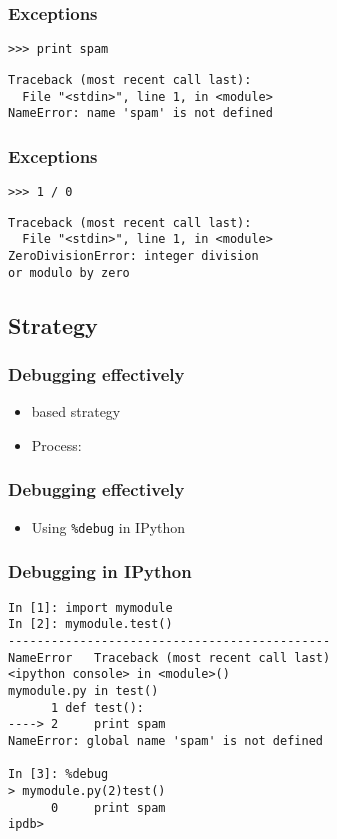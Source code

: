\documentclass[14pt,compress]{beamer}
\newcounter{time}
\newcommand{\inctime}[1]{\addtocounter{time}{#1}{\tiny \thetime\ m}}
\newcommand{\typ}[1]{\texttt{#1}}
\newcommand{\kwrd}[1]{ \texttt{\textbf{\color{blue}{#1}}}  }
\begin{document}
\begin{frame}[fragile]
 \frametitle{Exceptions}
 \begin{lstlisting}
>>> print spam
\end{lstlisting}
\pause
\begin{lstlisting}
Traceback (most recent call last):
  File "<stdin>", line 1, in <module>
NameError: name 'spam' is not defined
\end{lstlisting}
\end{frame}

\begin{frame}[fragile]
 \frametitle{Exceptions}
 \begin{lstlisting}
>>> 1 / 0
\end{lstlisting}
\pause
\begin{lstlisting}
Traceback (most recent call last):
  File "<stdin>", line 1, in <module>
ZeroDivisionError: integer division 
or modulo by zero
\end{lstlisting}
\end{frame}

\subsection{Strategy}
\begin{frame}[fragile]
    \frametitle{Debugging effectively}
    \begin{itemize}
        \item \kwrd{print} based strategy
        \item Process:
    \end{itemize}
\end{frame}

\begin{frame}[fragile]
    \frametitle{Debugging effectively}
    \begin{itemize}
      \item Using \typ{\%debug} in IPython
    \end{itemize}
\end{frame}

\begin{frame}[fragile]
\frametitle{Debugging in IPython}
\small
\begin{lstlisting}
In [1]: import mymodule
In [2]: mymodule.test()
---------------------------------------------
NameError   Traceback (most recent call last)
<ipython console> in <module>()
mymodule.py in test()
      1 def test():
----> 2     print spam
NameError: global name 'spam' is not defined

In [3]: %debug
> mymodule.py(2)test()
      0     print spam
ipdb> 
\end{lstlisting}
\inctime{15} 
\end{frame}
\end{document}
